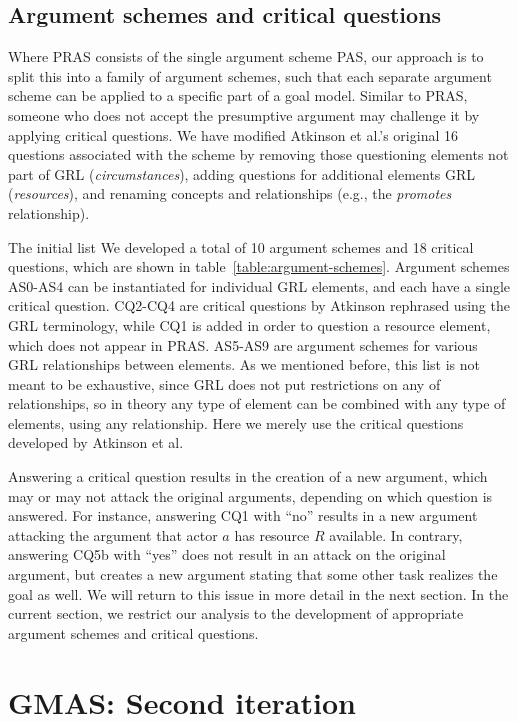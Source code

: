 \subsection{Argument schemes and critical questions}

Where PRAS consists of the single argument scheme PAS, our approach is to split this into a family of argument schemes, such that each separate argument scheme can be applied to a specific part of a goal model. Similar to PRAS, someone who does not accept the presumptive argument may challenge it by applying critical questions. We have modified Atkinson et al.'s original 16 questions associated with the scheme \cite{atkinson2006argumentation} by removing those questioning elements not part of GRL (\emph{circumstances}), adding questions for additional elements GRL (\emph{resources}), and renaming concepts and relationships (e.g., the \emph{promotes} relationship).

The initial list We developed a total of 10 argument schemes and 18 critical questions, which are shown in table~\ref{table:argument-schemes}. Argument schemes AS0-AS4 can be instantiated for individual GRL elements, and each have a single critical question. CQ2-CQ4 are critical questions by Atkinson rephrased using the GRL terminology, while CQ1 is added in order to question a resource element, which does not appear in PRAS. AS5-AS9 are argument schemes for various GRL relationships between elements. As we mentioned before, this list is not meant to be exhaustive, since GRL does not put restrictions on any of relationships, so in theory any type of element can be combined with any type of elements, using any relationship. Here we merely use the critical questions developed by Atkinson et al.
 
Answering a critical question results in the creation of a new argument, which may or may not attack the original arguments, depending on which question is answered. For instance, answering CQ1 with ``no'' results in a new argument attacking the argument that actor $a$ has resource $R$ available. In contrary, answering CQ5b with ``yes'' does not result in an attack on the original argument, but creates a new argument stating that some other task realizes the goal as well. We will return to this issue in more detail in the next section. In the current section, we restrict our analysis to the development of appropriate argument schemes and critical questions.

\section{GMAS: Second iteration}
\label{sect:gmas:2}

